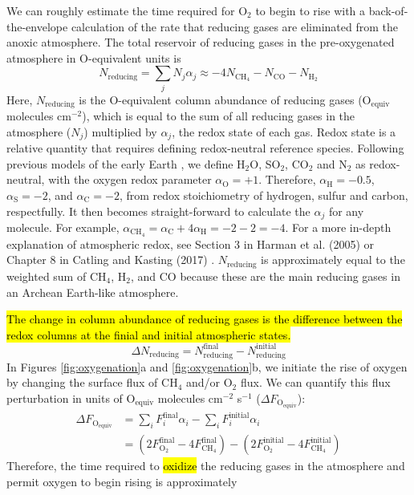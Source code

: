 \documentclass[9pt,twocolumn,twoside,lineno]{pnas-new}
\begin{document}
We can roughly estimate the time required for O$_2$ to begin to rise with a back-of-the-envelope calculation of the rate that reducing gases are eliminated from the anoxic atmosphere. The total reservoir of reducing gases in the pre-oxygenated atmosphere in O-equivalent units is
\begin{equation} 
    N_\mathrm{reducing} = \sum_j N_j \alpha_j \approx -4 N_\mathrm{CH_4} - N_\mathrm{CO} - N_\mathrm{H_2} 
\end{equation}
Here, $N_\mathrm{reducing}$ is the O-equivalent column abundance of reducing gases (O$_\mathrm{equiv}$ molecules cm$^{-2}$), which is equal to the sum of all reducing gases in the atmosphere ($N_j$) multiplied by $\alpha_j$, the redox state of each gas. Redox state is a relative quantity that requires defining redox-neutral reference species. Following previous models of the early Earth \cite{Zahnle_2006}, we define H$_2$O, SO$_2$, CO$_2$ and N$_2$ as redox-neutral, with the oxygen redox parameter $\alpha_\mathrm{O} = +1$. Therefore, $\alpha_\mathrm{H} = -0.5$, $\alpha_\mathrm{S} = -2$, and $\alpha_\mathrm{C} = -2$, from redox stoichiometry of hydrogen, sulfur and carbon, respectfully. It then becomes straight-forward to calculate the $\alpha_j$ for any molecule. For example, $\alpha_\mathrm{CH_4} = \alpha_\mathrm{C} + 4\alpha_\mathrm{H} = -2 - 2 = - 4$. For a more in-depth explanation of atmospheric redox, see Section 3 in Harman et al. (2005) \cite{Harman_2015} or Chapter 8 in Catling and Kasting (2017) \cite{Catling_2017}. $N_\mathrm{reducing}$ is approximately equal to the weighted sum of CH$_4$, H$_2$, and CO because these are the main reducing gases in an Archean Earth-like atmosphere.

\hl{The change in column abundance of reducing gases is the difference between the redox columns at the finial and initial atmospheric states.}
\begin{equation} 
    \Delta N_\mathrm{reducing} = N_\mathrm{reducing}^\text{final} - N_\mathrm{reducing}^\text{initial}
\end{equation}
In Figures \ref{fig:oxygenation}a and \ref{fig:oxygenation}b, we initiate the rise of oxygen by changing the surface flux of CH$_4$ and/or O$_2$ flux. We can quantify this flux perturbation in units of O$_\mathrm{equiv}$ molecules cm$^{-2}$ s$^{-1}$ ($\Delta F_\mathrm{O_{equiv}}$):
\begin{equation}
\begin{split}
    \Delta F_\mathrm{O_{equiv}} &= \sum_i F_i^\text{final} \alpha_i - \sum_i F_i^\text{initial} \alpha_i \\ 
    &= (2 F_\mathrm{O_2}^\text{final} - 4 F_\mathrm{CH_4}^\text{final}) - (2 F_\mathrm{O_2}^\text{initial} - 4 F_\mathrm{CH_4}^\text{initial})
\end{split}
\end{equation}
Therefore, the time required to \hl{oxidize} the reducing gases in the atmosphere and permit oxygen to begin rising is approximately
\end{document}
